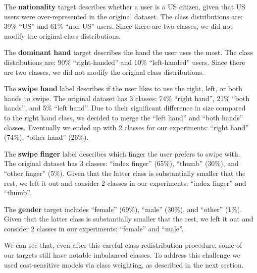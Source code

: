 \documentclass[sn-mathphys, pdflatex]{sn-jnl}
\begin{document}

The \textbf{nationality} target describes whether a user is a US citizen,
given that US users were over-represented in the original dataset.
The class distributions are: 39\% ``US'' and 61\% ``non-US'' users.
Since there are two classes, we did not modify the original class distributions.

The \textbf{dominant hand} target describes the hand the user uses the most.
The class distributions are: 90\% ``right-handed'' and 10\% ``left-handed'' users.
Since there are two classes, we did not modify the original class distributions.

The \textbf{swipe hand} label describes if the user likes to use the right, left, or both hands to swipe.
The original dataset has 3 classes: 74\% ``right hand'', 21\% ``both hands'', and 5\% ``left hand''.
Due to their significant difference in size compared to the right hand class,
we decided to merge the ``left hand'' and ``both hands'' classes.
Eventually we ended up with 2 classes for our experiments:
``right hand'' (74\%), ``other hand'' (26\%).

The \textbf{swipe finger} label describes which finger the user prefers to swipe with.
The original dataset has 3 classes: ``index finger'' (65\%), ``thumb'' (30\%), and ``other finger'' (5\%).
Given that the latter class is substantially smaller that the rest,
we left it out and consider 2 classes in our experiments: ``index finger'' and ``thumb''.

The \textbf{gender} target includes ``female'' (69\%), ``male'' (30\%), and ``other'' (1\%).
Given that the latter class is substantially smaller that the rest,
we left it out and consider 2 classes in our experiments: ``female'' and ``male''.

We can see that, even after this careful class redistribution procedure,
some of our targets still have notable imbalanced classes.
To address this challenge we used cost-sensitive models via class weighting,
as described in the next section.
\end{document}
